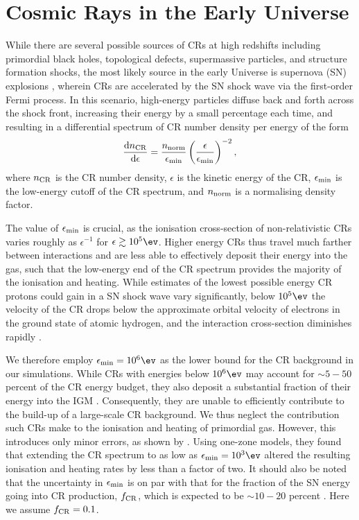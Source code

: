 \section{Cosmic Rays in the Early Universe}
\label{sec:context}
While there are several possible sources of CRs at high redshifts including primordial black holes, topological defects, supermassive particles, and structure formation shocks, the most likely source in the early Universe is supernova (SN) explosions \citep[e.g.,][]{GinzburgSyrovatskii1969,BiermannSigl2001,Stanev2004,Pfrommeretal2006}, wherein CRs are accelerated by the SN shock wave via the first-order Fermi process.  
In this scenario, high-energy particles diffuse back and forth across the shock front, increasing their energy by a small percentage each time, and resulting in a differential spectrum of CR number density per energy \citep{Longair1994} of the form
\begin{equation}
    \frac{{\rm d}n_{\rm \small CR}}{{\rm d}\epsilon} = \frac{n_{\rm norm}}{\epsilon_{\rm min}}
    \left( \frac{\epsilon}{\epsilon_{\rm min}} \right)^{-2},
\end{equation}
where $n_{\rm \small CR}$ is the CR number density, $\epsilon$ is the kinetic energy of the CR, $\epsilon_{\rm min}$ is the low-energy cutoff of the CR spectrum, and $n_{\rm norm}$ is a normalising density factor. 

The value of $\epsilon_{\rm min}$ is crucial, as the ionisation cross-section of non-relativistic CRs varies roughly as $\epsilon^{-1}$ for $\epsilon \gtrsim 10^5\ev$. 
Higher energy CRs thus travel much farther between interactions and are less able to effectively deposit their energy into the gas, such that the low-energy end of the CR spectrum provides the majority of the ionisation and heating.  
While estimates of the lowest possible energy CR protons could gain in a SN shock wave vary significantly, below $10^5\ev$ the velocity of the CR drops below the approximate orbital velocity of electrons in the ground state of atomic hydrogen, and the interaction cross-section diminishes rapidly \citep{Schlickeiser2002}. 

We therefore employ $\epsilon_{\rm min} = 10^6\ev$ as the lower bound for the CR background in our simulations.  
While CRs with energies below $10^6\ev$ may account for $\sim$$5-50$ percent of the CR energy budget, they also deposit a substantial fraction of their energy into the IGM \citep{SazonovSunyaev2015}. 
Consequently, they are unable to efficiently contribute to the build-up of a large-scale CR background. We thus neglect the contribution such CRs make to the ionisation and heating of primordial gas. 
However, this introduces only minor errors, as shown by \citet{StacyBromm2007}. Using one-zone models, they found that extending the CR spectrum to as low as $\epsilon_{\rm min} = 10^3\ev$ altered the resulting ionisation and heating rates by less than a factor of two.  
It should also be noted that the uncertainty in $\epsilon_{\rm min}$ is on par with that for the fraction of the SN energy going into CR production, $f_{\rm \small CR}$, which is expected to be $\sim$$10-20$ percent \citep{CaprioliSpitkovsky2014}.  
Here we assume $f_{\rm \small CR} = 0.1$.

